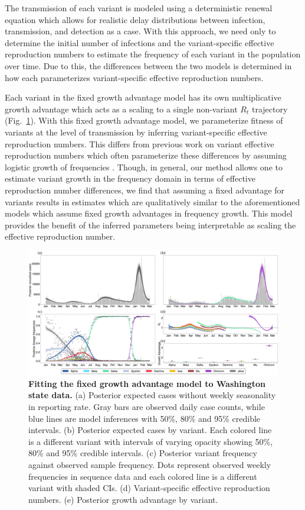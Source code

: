 \documentclass[11pt,oneside,letterpaper]{article}
\begin{document}
The transmission of each variant is modeled using a deterministic renewal equation which allows for realistic delay distributions between infection, transmission, and detection as a case.
With this approach, we need only to determine the initial number of infections and the variant-specific effective reproduction numbers to estimate the frequency of each variant in the population over time.
Due to this, the differences between the two models is determined in how each parameterizes variant-specific effective reproduction numbers.

Each variant in the fixed growth advantage model has its own multiplicative growth advantage which acts as a scaling to a single non-variant $R_{t}$ trajectory (Fig.~\ref{fig:fixed_growth_Washington}).
With this fixed growth advantage model, we parameterize fitness of variants at the level of transmission by inferring variant-specific effective reproduction numbers.
This differs from previous work on variant effective reproduction numbers which often parameterize these differences by assuming logistic growth of frequencies \cite{Earnest2021, Vhringer2021}.
Though, in general, our method allows one to estimate variant growth in the frequency domain in terms of effective reproduction number differences, we find that assuming a fixed advantage for variants results in estimates which are qualitatively similar to the aforementioned models which assume fixed growth advantages in frequency growth.
This model provides the benefit of the inferred parameters being interpretable as scaling the effective reproduction number.

\begin{figure}[h!]
  \centering
  \includegraphics[width=\linewidth]{figs/fixed_growth_Washington.png}
  \caption{\textbf{Fitting the fixed growth advantage model to Washington state data.}
  (a) Posterior expected cases without weekly seasonality in reporting rate.
  Gray bars are observed daily case counts, while blue lines are model inferences with 50\%, 80\% and 95\% credible intervals.
  (b) Posterior expected cases by variant.
  Each colored line is a different variant with intervals of varying opacity showing 50\%, 80\% and 95\% credible intervals.
  (c) Posterior variant frequency against observed sample frequency.
  Dots represent observed weekly frequencies in sequence data and each colored line is a different variant with shaded CIs.
  (d) Variant-specific effective reproduction numbers.
  (e) Posterior growth advantage by variant.
  }
  \label{fig:fixed_growth_Washington}
\end{figure}
\end{document}
